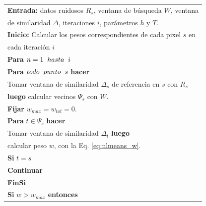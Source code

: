 \begin{algorithm}
	\begin{tabularx}{0.8\textwidth}{l}
		
		\textbf{Entrada:} datos ruidosos $R_s$, ventana de búsqueda $W$, ventana\\
		de similaridad $\Delta$, iteraciones $i$, parámetros $h$ y $T$.\\
		\hline
		\hspace*{0.6cm}\textbf{Inicio:} Calcular los pesos correspondientes de cada pixel $s$ en \\
		\hspace*{0.6cm}cada iteración $i$\\
		\hspace*{0.6cm}\textbf{Para} $n = 1 \hspace*{0.2cm} hasta \hspace*{0.2cm} i$\\
		\hspace*{0.9cm} \textbf{Para} $todo \hspace*{0.2cm} punto \hspace*{0.2cm} s$ \textbf{hacer}\\
		\hspace*{1.1cm} Tomar ventana de similaridad $\Delta_s$ de referencia en $s$ con $R_s$\\
		\hspace*{1.1cm} \textbf{luego} calcular vecinos $\Psi_s$ con $W$.\\
		\hspace*{1.1cm} \textbf{Fijar} $w_{max} =w_{tot} = 0$.\\
		\hspace*{1.1cm} \textbf{Para} $t\in \Psi_s$ \textbf{hacer}\\
		\hspace*{1.3cm} Tomar ventana de similaridad $\Delta_t$ \textbf{luego}\\
		\hspace*{1.3cm} calcular peso $w$, con la Eq. \ref{eq:nlmeans_w}.\\
		\hspace*{1.3cm} \textbf{Si} $t = s$\\
		\hspace*{1.5cm} \textbf{Continuar}\\
		\hspace*{1.3cm} \textbf{FinSi}\\
		\hspace*{1.3cm} \textbf{Si} $w > w_{max}$ \textbf{entonces}\\

\end{tabularx}
\end{algorithm}
